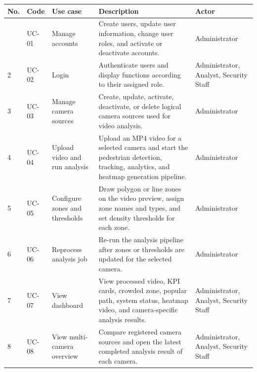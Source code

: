 \documentclass[12pt,a4paper]{report}
\renewcommand{\arraystretch}{1.25}
\begin{document}
\begin{table}[H]
\centering
\footnotesize
\setlength{\tabcolsep}{2.5pt}
\renewcommand{\arraystretch}{1.25}

\begin{tabularx}{\textwidth}{|
>{\centering\arraybackslash}p{0.6cm}|
>{\centering\arraybackslash}p{1.05cm}|
>{\raggedright\arraybackslash}p{2.35cm}|
>{\raggedright\arraybackslash}X|
>{\raggedright\arraybackslash}p{2.75cm}|}
\hline

\rowcolor{HeaderBlue}
\textbf{No.} & \textbf{Code} & \textbf{Use case} & \textbf{Description} & \textbf{Actor} \\
\hline

1 & UC-01 & Manage accounts 
& Create users, update user information, change user roles, and activate or deactivate accounts. 
& Administrator \\
\hline

2 & UC-02 & Login 
& Authenticate users and display functions according to their assigned role. 
& Administrator, Analyst, Security Staff \\
\hline

3 & UC-03 & Manage camera sources 
& Create, update, activate, deactivate, or delete logical camera sources used for video analysis. 
& Administrator \\
\hline

4 & UC-04 & Upload video and run analysis 
& Upload an MP4 video for a selected camera and start the pedestrian detection, tracking, analytics, and heatmap generation pipeline. 
& Administrator \\
\hline

5 & UC-05 & Configure zones and thresholds 
& Draw polygon or line zones on the video preview, assign zone names and types, and set density thresholds for each zone. 
& Administrator \\
\hline

6 & UC-06 & Reprocess analysis job 
& Re-run the analysis pipeline after zones or thresholds are updated for the selected camera. 
& Administrator \\
\hline

7 & UC-07 & View dashboard 
& View processed video, KPI cards, crowded zone, popular path, system status, heatmap video, and camera-specific analysis results. 
& Administrator, Analyst, Security Staff \\
\hline

8 & UC-08 & View multi-camera overview 
& Compare registered camera sources and open the latest completed analysis result of each camera. 
& Administrator, Analyst, Security Staff \\
\hline


\end{tabularx}
\end{table}
\end{document}
